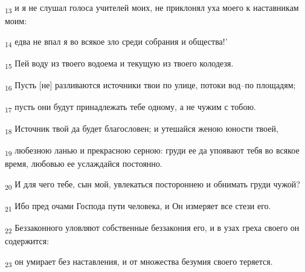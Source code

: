 \begin{tcolorbox}
\textsubscript{13} и я не слушал голоса учителей моих, не приклонял уха моего к наставникам моим:
\end{tcolorbox}
\begin{tcolorbox}
\textsubscript{14} едва не впал я во всякое зло среди собрания и общества!'
\end{tcolorbox}
\begin{tcolorbox}
\textsubscript{15} Пей воду из твоего водоема и текущую из твоего колодезя.
\end{tcolorbox}
\begin{tcolorbox}
\textsubscript{16} Пусть [не] разливаются источники твои по улице, потоки вод--по площадям;
\end{tcolorbox}
\begin{tcolorbox}
\textsubscript{17} пусть они будут принадлежать тебе одному, а не чужим с тобою.
\end{tcolorbox}
\begin{tcolorbox}
\textsubscript{18} Источник твой да будет благословен; и утешайся женою юности твоей,
\end{tcolorbox}
\begin{tcolorbox}
\textsubscript{19} любезною ланью и прекрасною серною: груди ее да упоявают тебя во всякое время, любовью ее услаждайся постоянно.
\end{tcolorbox}
\begin{tcolorbox}
\textsubscript{20} И для чего тебе, сын мой, увлекаться постороннею и обнимать груди чужой?
\end{tcolorbox}
\begin{tcolorbox}
\textsubscript{21} Ибо пред очами Господа пути человека, и Он измеряет все стези его.
\end{tcolorbox}
\begin{tcolorbox}
\textsubscript{22} Беззаконного уловляют собственные беззакония его, и в узах греха своего он содержится:
\end{tcolorbox}
\begin{tcolorbox}
\textsubscript{23} он умирает без наставления, и от множества безумия своего теряется.
\end{tcolorbox}
